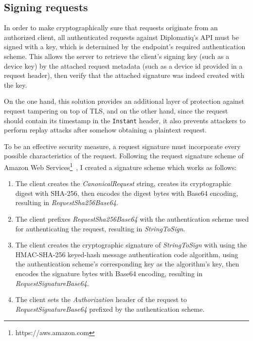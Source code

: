 \subsection{Signing requests}
\label{subsection:signing-requests}

In order to make cryptographically sure that requests originate from an authorized client, all authenticated requests against Diplomatiq's API must be signed with a key, which is determined by the endpoint's required authentication scheme. This allows the server to retrieve the client's signing key (such as a device key) by the attached request metadata (such as a device id provided in a request header), then verify that the attached signature was indeed created with the key.

On the one hand, this solution provides an additional layer of protection against request tampering on top of TLS, and on the other hand, since the request should contain its timestamp in the \lstinline{Instant} header, it also prevents attackers to perform replay attacks after somehow obtaining a plaintext request.

To be an effective security measure, a request signature must incorporate every possible characteristics of the request. Following the request signature scheme of Amazon Web Services\footnote{https://aws.amazon.com}~\cite{awssigning}, I created a signature scheme which works as follows:

\begin{enumerate}
\item The client creates the \emph{CanonicalRequest} string, creates its cryptographic digest with SHA-256, then encodes the digest bytes with Base64 encoding, resulting in \emph{RequestSha256Base64}.
\item The client prefixes \emph{RequestSha256Base64} with the authentication scheme used for authenticating the request, resulting in \emph{StringToSign}.
\item The client creates the cryptographic signature of \emph{StringToSign} with using the HMAC-SHA-256 keyed-hash message authentication code algorithm, using the authentication scheme's corresponding key as the algorithm's key, then encodes the signature bytes with Base64 encoding, resulting in \emph{RequestSignatureBase64}.
\item The client sets the \emph{Authorization} header of the request to \emph{RequestSignatureBase64} prefixed by the authentication scheme.
\end{enumerate}

